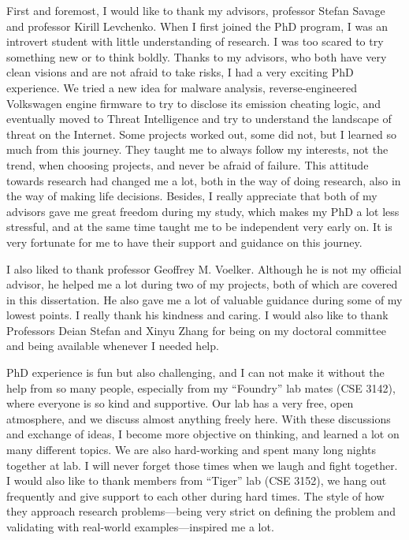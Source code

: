 \begin{acknowledgements}
First and foremost, I would like to thank my advisors, professor Stefan
Savage and professor Kirill Levchenko. When I first joined the PhD program,
I was an introvert student with little understanding of research. I was
too scared to try something new or to think boldly. Thanks to my advisors,
who both have very clean visions and are not afraid to take risks, I had a 
very exciting PhD experience. We tried a new idea for malware analysis, 
reverse-engineered Volkswagen engine firmware to try to disclose its emission 
cheating logic, and eventually moved to Threat Intelligence and try to understand 
the landscape of threat on the Internet. Some projects worked out, some did not, 
but I learned so much from this journey. They taught me to always follow my
interests, not the trend, when choosing projects, and never be afraid of 
failure. This attitude towards research had changed me a lot, both in the
way of doing research, also in the way of making life decisions. Besides, 
I really appreciate that both of my advisors gave me great freedom during
my study, which makes my PhD a lot less stressful, and at the same 
time taught me to be independent very early on. It is very fortunate for me to 
have their support and guidance on this journey.

I also liked to thank professor Geoffrey M. Voelker. Although he is not my
official advisor, he helped me a lot during two of my projects, both of 
which are covered in this dissertation. He also gave me a lot of valuable 
guidance during some of my lowest points. I really thank his kindness
and caring. I would also like to thank Professors Deian Stefan and Xinyu Zhang 
for being on my doctoral committee and being available whenever I needed help.

PhD experience is fun but also challenging, and I can not make it 
without the help from so many people, especially from my ``Foundry'' lab
mates (CSE 3142), where everyone is so kind and supportive.
Our lab has a very free, open atmosphere, and we discuss almost anything
freely here. With these discussions and exchange of ideas, I become 
more objective on thinking, and learned a lot on many different 
topics. We are also hard-working and spent many long nights together
at lab. I will never forget those times when we laugh and fight together. 
I would also like to thank members from ``Tiger'' lab (CSE 3152), we 
hang out frequently and give support to each other during hard times. The style 
of how they approach research problems---being very strict on defining the
problem and validating with real-world examples---inspired me a lot.


\end{acknowledgements}
